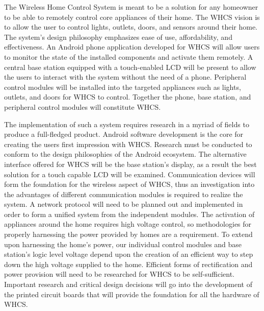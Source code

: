 The Wireless Home Control System is meant to be a solution for any homeowner to
be able to remotely control core appliances of their home. The WHCS vision is
to allow the user to control lights, outlets, doors, and sensors around their
home. The system{}'s design philosophy emphasizes ease of use, affordability,
and effectiveness. An Android phone application developed for WHCS will allow
users to monitor the state of the installed components and activate them
remotely. A central base station equipped with a touch{}-enabled LCD will be
present to allow the users to interact with the system without the need of a
phone. Peripheral control modules will be installed into the targeted
appliances such as lights, outlets, and doors for WHCS to control. Together the
phone, base station, and peripheral control modules will constitute WHCS.

The implementation of such a system requires research in a myriad of fields to
produce a full{}-fledged product. Android software development is the core for
creating the users first impression with WHCS. Research must be conducted to
conform to the design philosophies of the Android ecosystem. The alternative
interface offered for WHCS will be the base station{}'s display, as a result
the best solution for a touch capable LCD will be examined. Communication
devices will form the foundation for the wireless aspect of WHCS, thus an
investigation into the advantages of different communication modules is
required to realize the system. A network protocol will need to be planned out
and implemented in order to form a unified system from the independent modules.
The activation of appliances around the home requires high voltage control, so
methodologies for properly harnessing the power provided by homes are a
requirement. To extend upon harnessing the home{}'s power, our individual
control modules and base station{}'s logic level voltage depend upon the
creation of an efficient way to step down the high voltage supplied to the
home. Efficient forms of rectification and power provision will need to be
researched for WHCS to be self{}-sufficient. Important research and critical
design decisions will go into the development of the printed circuit boards
that will provide the foundation for all the hardware of WHCS.

